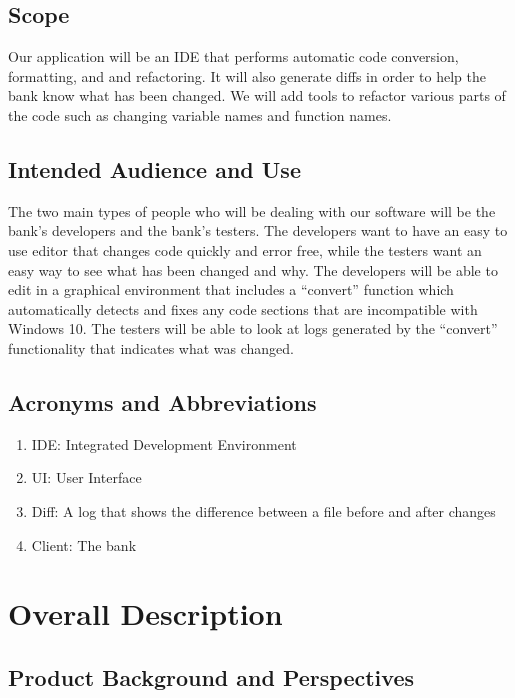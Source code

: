 \documentclass[12pt]{article}
\begin{document}
\subsection{Scope}

Our application will be an IDE that performs automatic code conversion, formatting, and and refactoring. It will also
generate diffs in order to help the bank know what has been changed. We will add tools
to refactor various parts of the code such as changing variable names and function names.

\subsection{Intended Audience and Use}

The two main types of people who will be dealing with our software will be the bank's developers and the bank's testers.
The developers want to have an easy to use editor that changes code quickly and error free, while the testers want
an easy way to see what has been changed and why. The developers will be able to edit in a graphical environment
that includes a ``convert'' function which automatically detects and fixes any code sections that are incompatible with Windows 10.
The testers will be able to look at logs generated by the ``convert'' functionality that indicates what was changed.

\subsection{Acronyms and Abbreviations}

\begin{enumerate}
    \item IDE: Integrated Development Environment
    \item UI: User Interface
    \item Diff: A log that shows the difference between a file before and after changes
    \item Client: The bank
\end{enumerate}

\section{Overall Description}

\subsection{Product Background and Perspectives}
\end{document}
